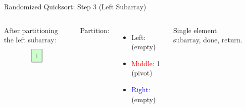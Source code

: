 \begin{frame}[t]{Randomized Quicksort: Step 3 (Left Subarray)}
  \begin{columns}[t]
    After partitioning the left subarray:
    \[
      \renewcommand{\arraystretch}{1.5}
      \begin{array}{|c|c|c|}
        \hline
        \cellcolor{green!20}{1} \\
        \hline
      \end{array}
    \]

    Partition:
    \begin{itemize}
      \item \textcolor{green!60!black}{Left:} (empty)
      \item \textcolor{red}{Middle:} 1 (pivot)
      \item \textcolor{blue}{Right:} (empty)
    \end{itemize}
    Single element subarray, done, return.
    \begin{minipage}[t]{\linewidth}
      \vspace{0pt} %
      \begin{center}


\end{center}
\end{minipage}
\end{columns}
\end{frame}
